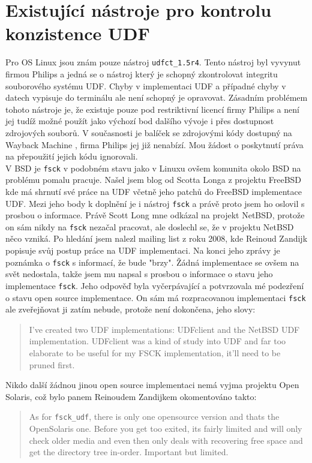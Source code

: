 \section{Existující nástroje pro kontrolu konzistence UDF}
Pro OS Linux jsou znám pouze nástroj \texttt{udfct\_1.5r4}. Tento nástroj byl vyvynut firmou Philips a jedná se o nástroj který je schopný zkontrolovat integritu souborového systému UDF. Chyby v implementaci UDF a případné chyby v datech vypisuje do terminálu ale není schopný je opravovat. Zásadním problémem tohoto nástroje je, že existuje pouze pod restriktivní licencí firmy Philips a není jej tudíž možné použít jako výchozí bod dalšího vývoje i přes dostupnost zdrojových souborů. V současnosti je balíček se zdrojovými kódy dostupný na Wayback Machine \cite{wayback}, firma Philips jej již nenabízí. Mou žádost o poskytnutí práva na přepoužití jejich kódu ignorovali.\\
V BSD je \texttt{fsck} v podobném stavu jako v Linuxu ovšem komunita okolo BSD na problému pomalu pracuje. Našel jsem blog \cite{scottuvblog} od Scotta Longa z projektu FreeBSD kde má shrnutí své práce na UDF včetně jeho patchů do FreeBSD implementace UDF. Mezi jeho body k doplnění je i nástroj \texttt{fsck} a právě proto jsem ho oslovil s prosbou o informace. Právě Scott Long mne odkázal na projekt NetBSD, protože on sám nikdy na \texttt{fsck} nezačal pracovat, ale doslechl se, že v projektu NetBSD něco vzniká. Po hledání jsem nalezl mailing list z roku 2008, kde Reinoud Zandijk popisuje svůj postup práce na UDF implementaci. Na konci jeho zprávy je poznámka o \texttt{fsck} s informací, že bude "brzy". Žádná implementace se ovšem na svět nedostala, takže jsem mu napsal s prosbou o informace o  stavu jeho implementace \texttt{fsck}. Jeho odpověď byla vyčerpávající a potvrzovala mé podezření o stavu open source implementace. On sám má rozpracovanou implementaci \texttt{fsck} ale zveřejňovat ji zatím nebude, protože není dokončena, jeho slovy: 
\begin{quote} 
I've created two UDF implementations: UDFclient \cite{13monkey} and the NetBSD UDF implementation. UDFclient was a kind of study into UDF and far too elaborate to be useful for my FSCK implementation, it'll need to be pruned first.
\end{quote} 
Nikdo další žádnou jinou open source implementaci nemá vyjma projektu Open Solaris, což bylo panem Reinoudem Zandijkem okomentováno takto:
\begin{quote}
As for \texttt{fsck\_udf}, there is only one opensource version and thats the OpenSolaris one. Before you get too exited, its fairly limited and will only check older media and even then only deals with recovering free space and get the directory tree in-order. Important but limited.
\end{quote}
